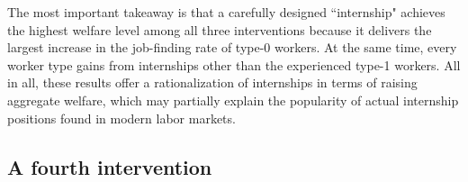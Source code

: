 \documentclass[12pt]{article} %
\theoremstyle{definition}
\begin{document}
The most important takeaway is that a carefully designed ``internship" achieves the highest welfare level among all three interventions because it delivers the largest increase in the job-finding rate of type-0 workers.
At the same time, every worker type gains from internships other than the experienced type-1 workers.
All in all, these results offer a rationalization of internships in terms of raising aggregate welfare, which may partially explain the popularity of actual internship positions found in modern labor markets.

\subsection{A fourth intervention} \label{section fourth intervention}
\end{document}
